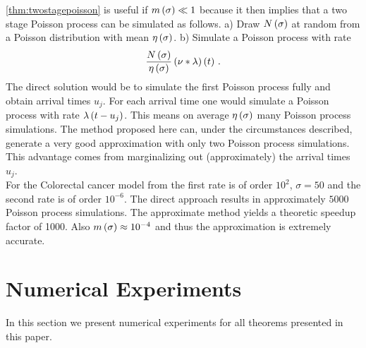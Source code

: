\documentclass{amsart}
\numberwithin{equation}{section}
\begin{document}
\begin{remark}
\autoref{thm:twostagepoisson} is useful if $m\left(\sigma\right) \ll 1$ because it then implies that a two stage Poisson process can be simulated as follows. a) Draw $N\left(\sigma\right)$ at random from a Poisson distribution with mean $\eta\left(\sigma\right)$. b) Simulate a Poisson process with rate
\[
\frac{N\left(\sigma\right)}{\eta\left(\sigma\right)} \left(\nu \ast \lambda\right)\left(t\right) \, .
\]
The direct solution would be to simulate the first Poisson process fully and obtain arrival times $u_j$. For each arrival time one would simulate a Poisson process with rate $\lambda\left(t-u_j\right)$. This means on average $\eta\left(\sigma\right)$ many Poisson process simulations. The method proposed here can, under the circumstances described, generate a very good approximation with only two Poisson process simulations. This advantage comes from marginalizing out (approximately) the arrival times $u_j$.\\

\noindent For the Colorectal cancer model from \cite{jeon2008evaluation} the first rate is of order $10^2$, $\sigma=50$ and the second rate is of order $10^{-6}$. The direct approach results in approximately $5000$ Poisson process simulations. The approximate method yields a theoretic speedup factor of 1000. Also $m\left(\sigma\right) \approx 10^{-4}$ and thus the approximation is extremely accurate.
\end{remark}


\newpage
\section{Numerical Experiments}
In this section we present numerical experiments for all theorems presented in this paper.
\end{document}
